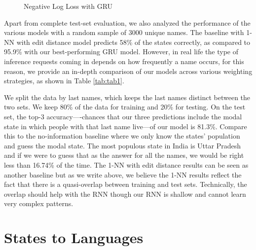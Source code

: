 \documentclass[11pt,  letterpaper]{article}
\begin{document}
\begin{figure}[ht]
  \centering
  \caption{Negative Log Loss with GRU}
  \label{fig3:gru_loss}
\end{figure}


Apart from complete test-set evaluation, we also analyzed the performance of the various models with a random sample of 3000 unique names. The baseline with 1-NN with edit distance model predicts 58\% of the states correctly, as compared to 95.9\% with our best-performing GRU model. However, in real life the type of inference requests coming in depends on how frequently a name occurs, for this reason, we provide an in-depth comparison of our models across various weighting strategies, as shown in Table \ref{tab:tab1}.



We split the data by last names, which keeps the last names distinct between the two sets. We keep 80\% of the data for training and 20\% for testing. On the test set, the top-3 accuracy—-chances that our three predictions include the modal state in which people with that last name live—of our model is 81.3\%. Compare this to the no-information baseline where we only know the states' population and guess the modal state. The most populous state in India is Uttar Pradesh and if we were to guess that as the answer for all the names, we would be right less than 16.74\% of the time. The 1-NN with edit distance results can be seen as another baseline but as we write above, we believe the 1-NN results reflect the fact that there is a quasi-overlap between training and test sets. Technically, the overlap should help with the RNN though our RNN is shallow and cannot learn very complex patterns. 

\section{States to Languages}
\end{document}
